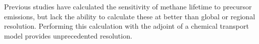 Previous studies have calculated the sensitivity of methane lifetime to precursor emissions\cite{ref:holmes2013}, but lack the ability to calculate these at better than global or regional resolution. Performing this calculation with the adjoint of a chemical transport model provides unprecedented resolution.